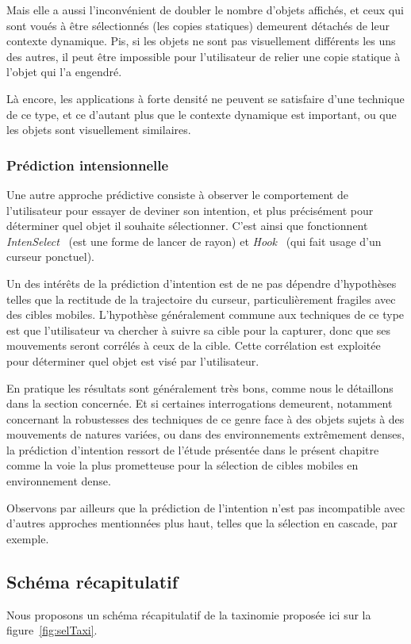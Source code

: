     Mais elle a aussi l'inconvénient de doubler le nombre d'objets affichés, et ceux qui sont voués à être sélectionnés (les copies statiques) demeurent détachés de leur contexte dynamique. Pis, si les objets ne sont pas visuellement différents les uns des autres, il peut être impossible pour l'utilisateur de relier une copie statique à l'objet qui l'a engendré.
    
    Là encore, les applications à forte densité ne peuvent se satisfaire d'une technique de ce type, et ce d'autant plus que le contexte dynamique est important, ou que les objets sont visuellement similaires.
    
	\subsubsection{Prédiction intensionnelle}
    Une autre approche prédictive consiste à observer le comportement de l'utilisateur pour essayer de deviner son intention, et plus précisément pour déterminer quel objet il souhaite sélectionner. C'est ainsi que fonctionnent \emph{IntenSelect}~\cite{de2005intenselect} (est une forme de lancer de rayon) et \emph{Hook}~\cite{ortega2013hook} (qui fait usage d'un curseur ponctuel).
    
    Un des intérêts de la prédiction d'intention est de ne pas dépendre d'hypothèses telles que la rectitude de la trajectoire du curseur, particulièrement \og fragiles \fg{} avec des cibles mobiles. L'hypothèse généralement commune aux techniques de ce type est que l'utilisateur va chercher à \og suivre \fg{} sa cible pour la capturer, donc que ses mouvements seront corrélés à ceux de la cible. Cette corrélation est exploitée pour déterminer quel objet est visé par l'utilisateur.
    
    En pratique les résultats sont généralement très bons, comme nous le détaillons dans la section concernée. Et si certaines interrogations demeurent, notamment concernant la robustesses des techniques de ce genre face à des objets sujets à des mouvements de natures variées, ou dans des environnements extrêmement denses, la prédiction d'intention ressort de l'étude présentée dans le présent chapitre comme la voie la plus prometteuse pour la sélection de cibles mobiles en environnement dense.
    
    Observons par ailleurs que la prédiction de l'intention n'est pas incompatible avec d'autres approches mentionnées plus haut, telles que la sélection en cascade, par exemple.
    
    \subsection{Schéma récapitulatif}
	Nous proposons un schéma récapitulatif de la taxinomie proposée ici sur la figure~\ref{fig:selTaxi}.
    
